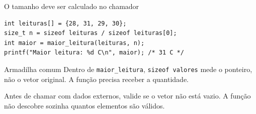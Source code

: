 \begin{frame}[fragile]{O tamanho deve ser calculado no chamador}
\begin{lstlisting}
int leituras[] = {28, 31, 29, 30};
size_t n = sizeof leituras / sizeof leituras[0];
int maior = maior_leitura(leituras, n);
printf("Maior leitura: %d C\n", maior); /* 31 C */
\end{lstlisting}
\begin{alertblock}{Armadilha comum}
Dentro de \texttt{maior\_leitura}, \texttt{sizeof valores} mede o ponteiro, não o vetor original. A função precisa receber a quantidade.
\end{alertblock}
\small Antes de chamar com dados externos, valide se o vetor não está vazio. A função não descobre sozinha quantos elementos são válidos.
\end{frame}
